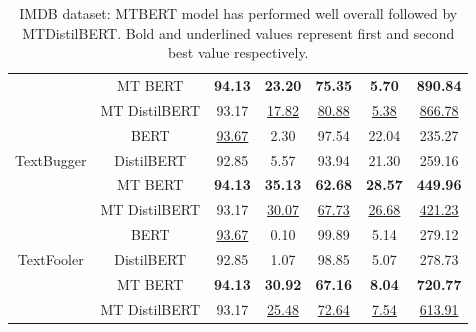 \documentclass[%
	BCOR=8mm, %
	DIV=12,
	toc=bibliography, %
	toc=listof, %
	oneside, %
	egregdoesnotlikesansseriftitles, %
	]{scrbook}
\begin{document}
\begin{table}[H]
{\begin{tabular}{|c|c|c|c|c|c|c|}
                     & MT BERT &              \textbf{  94.13 }&                   \textbf{ 23.20} &                 \textbf{ 75.35} &                      \textbf{5.70} &          \textbf{ 890.84} \\
                     & MT DistilBERT &                93.17 &                   \underline{ 17.82} &                  \underline{80.88} &                     \underline{ 5.38} &           \underline{866.78} \\
                \midrule
                     & BERT &               		\underline{ 93.67} &                     2.30 &                  97.54 &                     22.04 &           235.27 \\
 TextBugger & DistilBERT &                92.85 &                     5.57 &                  93.94 &                     21.30 &           259.16 \\
                     & MT BERT &                \textbf{94.13} &                    \textbf{35.13} &                 \textbf{ 62.68} &                     \textbf{28.57} &           \textbf{449.96} \\
                     & MT DistilBERT &          93.17 &                   \underline{ 30.07} &                  \underline{67.73} &                     \underline{26.68} &           \underline{421.23} \\
                \midrule
                    & BERT &                		\underline{93.67} &                     0.10 &                  99.89 &                      5.14 &           279.12 \\
  TextFooler & DistilBERT &                92.85 &                     1.07 &                  98.85 &                      5.07 &           278.73 \\
                    & MT BERT &                \textbf{94.13} &          \textbf{ 30.92}&     \textbf{67.16} &        \textbf{8.04} &   \textbf{720.77} \\
                    & MT DistilBERT &          93.17 &                    \underline{25.48 }&                  \underline{72.64} &                     \underline{ 7.54 }&           \underline{613.91} \\
 \bottomrule
 \end{tabular}
    }
    \caption[Experiment Result of IMDB dataset]{IMDB dataset: MTBERT model has performed well overall followed by MTDistilBERT. Bold and underlined values represent first and second best value respectively.}
    \label{table:IMDBExpRes}
\end{table}
\end{document}
